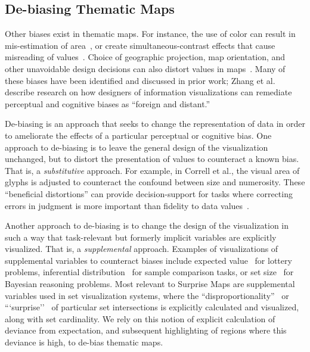 \documentclass[journal]{vgtc}                %
\begin{document}
\subsection{De-biasing Thematic Maps}

Other biases exist in thematic maps. For instance, the use of color can result in mis-estimation of area~\cite{cleveland1983color}, or create simultaneous-contrast effects that cause misreading of values~\cite{mittelstadt2014methods}. Choice of geographic projection, map orientation, and other unavoidable design decisions can also distort values in maps~\cite{monmonier2014lie}. Many of these biases have been identified and discussed in prior work; Zhang et al. \cite{zhang2015designing} describe research on how designers of information visualizations can remediate perceptual and cognitive biases as ``foreign and distant.''

De-biasing is an approach that seeks to change the representation of data in order to ameliorate the effects of a particular perceptual or cognitive bias. One approach to de-biasing is to leave the general design of the visualization unchanged, but to distort the presentation of values to counteract a known bias. That is, a \emph{substitutive} approach. For example, in Correll et al.\cite{correll2013quantity}, the visual area of glyphs is adjusted to counteract the confound between size and numerosity. These ``beneficial distortions'' can provide decision-support for tasks where correcting errors in judgment is more important than fidelity to data values~\cite{CG14a}.

Another approach to de-biasing is to change the design of the visualization in such a way that task-relevant but formerly implicit variables are explicitly visualized. That is, a \emph{supplemental} approach. Examples of visualizations of supplemental variables to counteract biases include expected value~\cite{inbar2007graphical} for lottery problems, inferential distribution~\cite{correll2014error} for sample comparison tasks, or set size~\cite{ottley2016improving} for Bayesian reasoning problems. Most relevant to Surprise Maps are supplemental variables used in set visualization systems, where the ``disproportionality''~\cite{alsallakh2013radial} or ```surprise''~\cite{lex2014upset} of particular set intersections is explicitly calculated and visualized, along with set cardinality. We rely on this notion of explicit calculation of deviance from expectation, and subsequent highlighting of regions where this deviance is high, to de-bias thematic maps.
\end{document}
